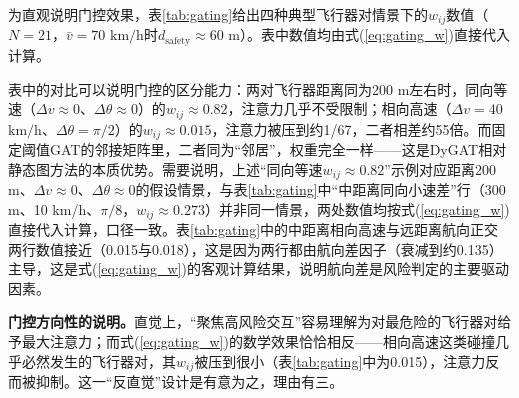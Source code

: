 \documentclass[12pt,a4paper,UTF8]{ctexart}
\begin{document}
为直观说明门控效果，表\ref{tab:gating}给出四种典型飞行器对情景下的$w_{ij}$数值（$N=21$，$\bar{v}=70$ $\mathrm{km/h}$时$d_{\text{safety}}\approx60$ m）。表中数值均由式(\ref{eq:gating_w})直接代入计算。

\begin{table}[H]
    \centering\small
    \caption{$w_{ij}$在不同飞行器对情景下的门控效果（按式(\ref{eq:gating_w})计算）}
    \label{tab:gating}
\end{table}

表中的对比可以说明门控的区分能力：两对飞行器距离同为200 m左右时，同向等速（$\Delta v\approx0$、$\Delta\theta\approx0$）的$w_{ij}\approx0.82$，注意力几乎不受限制；相向高速（$\Delta v=40$ $\mathrm{km/h}$、$\Delta\theta=\pi/2$）的$w_{ij}\approx0.015$，注意力被压到约1/67，二者相差约55倍。而固定阈值GAT的邻接矩阵里，二者同为“邻居”，权重完全一样——这是DyGAT相对静态图方法的本质优势。需要说明，上述“同向等速$w_{ij}\approx0.82$”示例对应距离200 m、$\Delta v\approx0$、$\Delta\theta\approx0$的假设情景，与表\ref{tab:gating}中“中距离同向小速差”行（300 m、10 km/h、$\pi/8$，$w_{ij}\approx0.273$）并非同一情景，两处数值均按式(\ref{eq:gating_w})直接代入计算，口径一致。表\ref{tab:gating}中的中距离相向高速与远距离航向正交两行数值接近（0.015与0.018），这是因为两行都由航向差因子（衰减到约0.135）主导，这是式(\ref{eq:gating_w})的客观计算结果，说明航向差是风险判定的主要驱动因素。

\textbf{门控方向性的说明。}直觉上，“聚焦高风险交互”容易理解为对最危险的飞行器对给予最大注意力；而式(\ref{eq:gating_w})的数学效果恰恰相反——相向高速这类碰撞几乎必然发生的飞行器对，其$w_{ij}$被压到很小（表\ref{tab:gating}中为0.015），注意力反而被抑制。这一“反直觉”设计是有意为之，理由有三。
\end{document}
